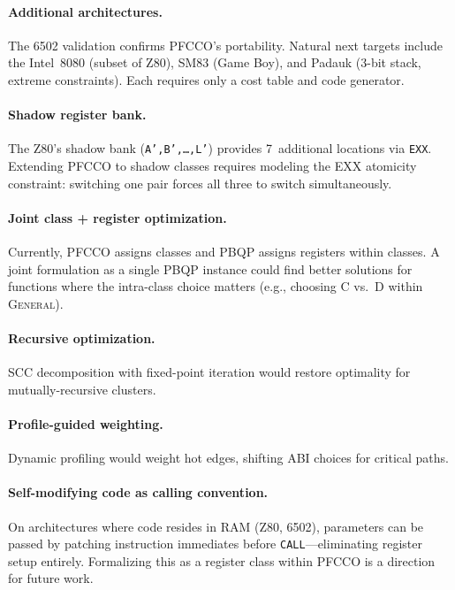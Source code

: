 \documentclass[sigplan,screen,nonacm]{acmart}
\begin{document}
\paragraph{Additional architectures.}
The 6502 validation confirms PFCCO's portability.  Natural next targets
include the Intel~8080 (subset of Z80), SM83 (Game Boy), and Padauk
(3-bit stack, extreme constraints).  Each requires only a cost table and
code generator.

\paragraph{Shadow register bank.}
The Z80's shadow bank (\texttt{A',B',\ldots,L'}) provides 7~additional
locations via \texttt{EXX}.  Extending PFCCO to shadow classes requires
modeling the EXX atomicity constraint: switching one pair forces all
three to switch simultaneously.

\paragraph{Joint class + register optimization.}
Currently, PFCCO assigns classes and PBQP assigns registers within classes.
A joint formulation as a single PBQP instance could find better solutions
for functions where the intra-class choice matters (e.g., choosing C vs.\ D
within \textsc{General}).

\paragraph{Recursive optimization.}
SCC decomposition with fixed-point iteration would restore optimality for
mutually-recursive clusters.

\paragraph{Profile-guided weighting.}
Dynamic profiling would weight hot edges, shifting ABI choices for critical
paths.

\paragraph{Self-modifying code as calling convention.}
On architectures where code resides in RAM (Z80, 6502), parameters can be
passed by patching instruction immediates before \texttt{CALL}---eliminating
register setup entirely.  Formalizing this as a register class within PFCCO
is a direction for future work.
\end{document}
